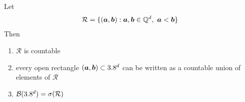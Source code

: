 \begin{proposition} %
\label{prop:rational-open-rectangles-generate-borel-sigma-algebra}
Let
\[
\mathcal{R}
=
\{(\vect{a},\vect{b}) : \vect{a},\vect{b} \in \Q^d,\ \vect{a}<\vect{b}\}
\]
Then
\begin{enumerate}[label=(\alph*)]
\item 
$\mathcal{R}$ is countable
\item 
every open rectangle $({\boldsymbol{a}},{\boldsymbol{b}}) \subset 3.8^d$ 
can be written as a countable union of elements of $\mathcal{R}$ \label{item:open-rectangles-countable-union-rational-open-rectangles}
\item
\(
\mathcal{B}(3.8^d)=\sigma(\mathcal{R})
\)
\qedhere
\end{enumerate}
\end{proposition}

